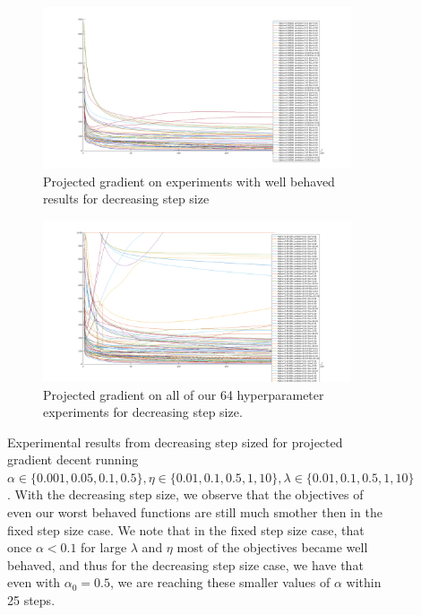 \documentclass{article}
\newcommand{\0}{\mathrm{0}}
\newcommand{\1}{\mathrm{1}}
\begin{document}
\begin{figure}[H]
  \begin{subfigure}[b]{\textwidth}
    \includegraphics[width=\textwidth]{proj-gradient-dec-wellb.png}
    \caption{Projected gradient on experiments with well behaved results for decreasing step size}
  \end{subfigure}
  \begin{subfigure}[b]{\textwidth}
    \includegraphics[width=\textwidth]{proj-gradient-dec-all.png}
    \caption{Projected gradient on all of our 64 hyperparameter experiments for decreasing step size.}
  \end{subfigure}
  \caption{Experimental results from decreasing step sized for projected gradient decent running $\alpha \in \{0.001, 0.05, 0.1, 0.5\}, \eta \in \{ 0.01, 0.1, 0.5, 1, 10 \}, \lambda \in \{ 0.01, 0.1, 0.5, 1, 10\} $.
    With the decreasing step size, we observe that the objectives of even our worst behaved functions are still much smother then in the fixed step size case.  We note that in the fixed step size case, that once $\alpha < 0.1$ for large $\lambda$ and $\eta$ most of the objectives became well behaved, and thus for the decreasing step size case, we have that even with $\alpha_0 = 0.5$, we are reaching these smaller values of $\alpha$ within 25 steps.
  }
\end{figure}
\end{document}
